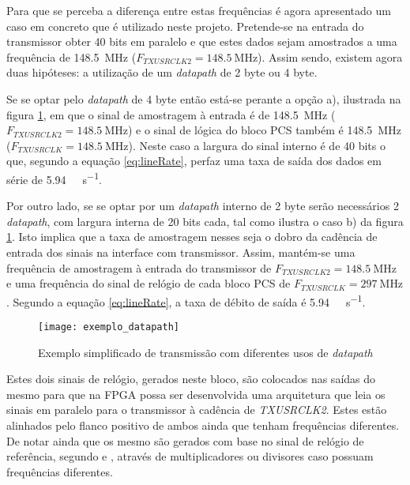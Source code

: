 Para que se perceba a diferença entre estas frequências é agora apresentado um caso em concreto que é utilizado neste projeto. Pretende-se na entrada do transmissor obter 40 bits em paralelo e que estes dados sejam amostrados a uma frequência de \SI{148.5}{\mega\hertz} ($F_{TXUSRCLK2} = \SI{148.5}{\mega\hertz}$). Assim sendo, existem agora duas hipóteses: a utilização de um \textit{datapath} de 2 byte ou 4 byte.

Se se optar pelo \textit{datapath} de 4 byte então está-se perante a opção a), ilustrada na figura \ref{fig:exemplo_datapaths}, em que o sinal de amostragem à entrada é de \SI{148.5}{\mega\hertz} ($F_{TXUSRCLK2} = \SI{148.5}{\mega\hertz}$) e o sinal de lógica do bloco PCS também é \SI{148.5}{\mega\hertz} ($F_{TXUSRCLK} = \SI{148.5}{\mega\hertz}$). Neste caso a largura do sinal interno é de 40 bits o que, segundo a equação \ref{eq:lineRate}, perfaz uma taxa de saída dos dados em série de \SI{5.94}{\giga\bit\per\second}.

Por outro lado, se se optar por um \textit{datapath} interno de 2 byte serão necessários 2 \textit{datapath}, com largura interna de 20 bits cada, tal como ilustra o caso b) da figura \ref{fig:exemplo_datapaths}. Isto implica que a taxa de amostragem nesses seja o dobro da cadência de entrada dos sinais na interface com transmissor. Assim, mantém-se uma frequência de amostragem à entrada do transmissor de $F_{TXUSRCLK2} = \SI{148.5}{\mega\hertz}$ e uma frequência do sinal de relógio de cada bloco PCS de $F_{TXUSRCLK} = \SI{297}{\mega\hertz} $. Segundo a equação \ref{eq:lineRate}, a taxa de débito de saída é \SI{5.94}{\giga\bit\per\second}.

\begin{figure}[h!]
 	\begin{center}
 		\leavevmode
 		\texttt{[image: exemplo\_datapath]}
 		\caption[Exemplo simplificado de transmissão com diferentes usos de \textit{datapath}]{Exemplo simplificado de transmissão com diferentes usos de \textit{datapath}}
 		\label{fig:exemplo_datapaths}
 	\end{center}
 \end{figure}

Estes dois sinais de relógio, gerados neste bloco, são colocados nas saídas do mesmo para que na FPGA possa ser desenvolvida uma arquitetura que leia os sinais em paralelo para o transmissor à cadência de \textit{TXUSRCLK2}. Estes estão alinhados pelo flanco positivo de ambos ainda que tenham frequências diferentes. De notar ainda que os mesmo são gerados com base no sinal de relógio de referência, segundo \cite{R011} e \cite{R022}, através de multiplicadores ou divisores caso possuam frequências diferentes.


